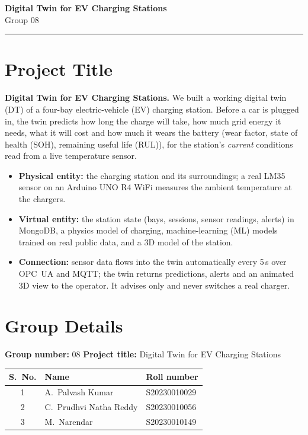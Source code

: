 \documentclass[11pt,a4paper]{article}
\begin{document}
\begin{center}
  {\LARGE\bfseries\color{accent} Digital Twin for EV Charging Stations}\\[3pt]
  {\large Group 08}\\[2pt]
  \rule{0.6\textwidth}{0.4pt}
\end{center}
\vspace{-4pt}

\section{Project Title}
\textbf{Digital Twin for EV Charging Stations.} We built a working digital twin (DT) of a four-bay electric-vehicle
(EV) charging station. Before a car is plugged in, the twin predicts how long the charge will take, how much grid
energy it needs, what it will cost and how much it wears the battery (wear factor, state of health (SOH), remaining
useful life (RUL)), for the station's \emph{current} conditions read from a live temperature sensor.
\begin{itemize}
  \item \textbf{Physical entity:} the charging station and its surroundings; a real LM35 sensor on an Arduino UNO R4
        WiFi measures the ambient temperature at the chargers.
  \item \textbf{Virtual entity:} the station state (bays, sessions, sensor readings, alerts) in MongoDB, a physics
        model of charging, machine-learning (ML) models trained on real public data, and a 3D model of the station.
  \item \textbf{Connection:} sensor data flows into the twin automatically every 5\,s over OPC~UA and MQTT; the twin
        returns predictions, alerts and an animated 3D view to the operator. It advises only and never switches a
        real charger.
\end{itemize}

\section{Group Details}
\textbf{Group number:} 08 \qquad \textbf{Project title:} Digital Twin for EV Charging Stations
\begin{center}
\small
\begin{tabular}{@{}cll@{}}
  \toprule
  \textbf{S.\ No.} & \textbf{Name} & \textbf{Roll number} \\
  \midrule
  1 & A.\ Palvash Kumar         & S20230010029 \\
  2 & C.\ Prudhvi Natha Reddy   & S20230010056 \\
  3 & M.\ Narendar              & S20230010149 \\
  \bottomrule
\end{tabular}
\end{center}
\end{document}
